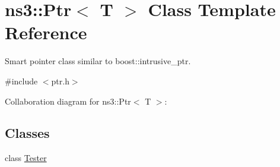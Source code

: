 \hypertarget{classns3_1_1Ptr}{}\section{ns3\+:\+:Ptr$<$ T $>$ Class Template Reference}
\label{classns3_1_1Ptr}


Smart pointer class similar to {\ttfamily boost\+::intrusive\+\_\+ptr}.  




{\ttfamily \#include $<$ptr.\+h$>$}



Collaboration diagram for ns3\+:\+:Ptr$<$ T $>$\+:
\subsection*{Classes}
\begin{DoxyCompactItemize}
\item 
class \hyperlink{classns3_1_1Ptr_1_1Tester}{Tester}
\end{DoxyCompactItemize}
